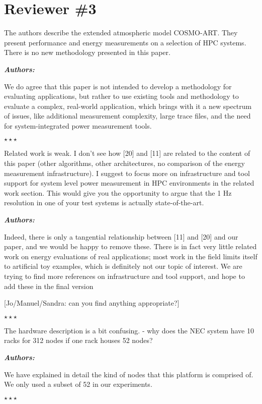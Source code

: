 \documentclass[a4paper,11pt]{article}
\newcounter{question}
\newcommand{\weReply}{\vspace{0.25cm} {\bf \noindent } \addtocounter{question}{1} \textbf{\emph{Authors:}} \medskip \em\par}
\newenvironment{weSay}{\bigskip \weReply \begin{it}}{\end{it}\begin{center} \samepage$\star \star \star$ \end{center}}
\begin{document}
\section*{Reviewer \#3}

The authors describe the extended atmospheric model COSMO-ART. They present
performance and energy measurements on a selection of HPC systems. There
is no new methodology presented in this paper.

\begin{weSay}
We do agree that this paper is not intended to develop a methodology for evaluating applications, but rather to use existing tools and methodology to evaluate a complex, real-world application, which brings with it a new spectrum of issues, like additional measurement complexity, large trace files, and the need for system-integrated power measurement tools.
\end{weSay}

Related work is weak. I don't see how [20] and [11] are related to the content
of this paper (other algorithms, other architectures, no comparison of the
energy measurement infrastructure). I suggest to focus more on infrastructure
and tool support for system level power measurement in HPC environments in
the related work section. This would give you the opportunity to argue that
the 1 Hz resolution in one of your test systems is actually state-of-the-art.

\begin{weSay}
Indeed, there is only a tangential relationship between [11] and [20] and our paper, and we would be happy to remove these.  There is in fact very little related work on energy evaluations of real applications; most work in the field limits itself to artificial toy examples, which is definitely not our topic of interest.  We are trying to find more references on infrastructure and tool support, and hope to add these in the final version


 [Jo/Manuel/Sandra: can you find anything appropriate?]
\end{weSay}

The hardware description is a bit confusing.
- why does the NEC system have 10 racks for 312 nodes if one rack houses 52
     nodes?

\begin{weSay}
We have explained in detail the kind of nodes that this platform is comprised of.
We only used a subset of 52 in our experiments.
\end{weSay}
\end{document}
